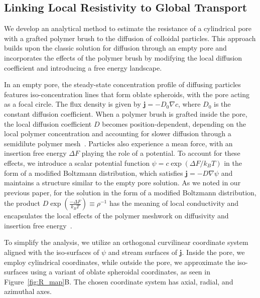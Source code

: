 \documentclass[12pt, a4paper]{article}
\begin{document}

\subsection{Linking Local Resistivity to Global Transport}

We develop an analytical method to estimate the resistance of a cylindrical pore with a grafted polymer brush to the diffusion of colloidal particles. 
This approach builds upon the classic solution for diffusion through an empty pore and incorporates the effects of the polymer brush by modifying the local diffusion coefficient and introducing a free energy landscape.

In an empty pore, the steady-state concentration profile of diffusing particles features iso-concentration lines that form oblate spheroids, with the pore acting as a focal circle.
The flux density is given by $\mathbf{j} = -D_0 \nabla c$, where $D_0$ is the constant diffusion coefficient.
When a polymer brush is grafted inside the pore, the local diffusion coefficient $D$ becomes position-dependent, depending on the local polymer concentration and accounting for slower diffusion through a semidilute polymer mesh~\cite{Cai2011}.
Particles also experience a mean force, with an insertion free energy $\Delta F$ playing the role of a potential. To account for these effects, we introduce a scalar potential function $\psi = c\exp(\Delta F / k_B T)$ in the form of a modified Boltzmann distribution, which satisfies $\mathbf{j} = -D \nabla \psi$ and maintains a structure similar to the empty pore solution.
As we noted in our previous paper, for the solution in the form of a modified Boltzmann distribution, the product $D \exp\left( \frac{-\Delta F}{k_B T} \right) \equiv \rho^{-1}$ has the meaning of local conductivity and encapsulates the local effects of the polymer meshwork on diffusivity and insertion free energy~\cite{Laktionov2023}.

To simplify the analysis, we utilize an orthogonal curvilinear coordinate system aligned with the iso-surfaces of $\psi$ and stream surfaces of $\bm{j}$.
Inside the pore, we employ cylindrical coordinates, while outside the pore, we approximate the iso-surfaces using a variant of oblate spheroidal coordinates, as seen in Figure~\ref{fig:R_map}B. The chosen coordinate system has axial, radial, and azimuthal axes.
\end{document}
